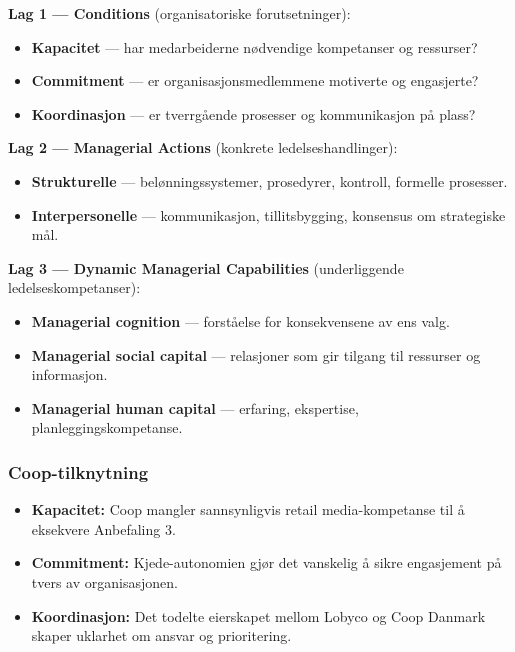 \textbf{Lag 1 --- Conditions} (organisatoriske forutsetninger):
\begin{itemize}
  \item \textbf{Kapacitet} --- har medarbeiderne nødvendige kompetanser
    og ressurser?
  \item \textbf{Commitment} --- er organisasjonsmedlemmene motiverte og
    engasjerte?
  \item \textbf{Koordinasjon} --- er tverrgående prosesser og
    kommunikasjon på plass?
\end{itemize}

\textbf{Lag 2 --- Managerial Actions} (konkrete ledelseshandlinger):
\begin{itemize}
  \item \textbf{Strukturelle} --- belønningssystemer, prosedyrer,
    kontroll, formelle prosesser.
  \item \textbf{Interpersonelle} --- kommunikasjon, tillitsbygging,
    konsensus om strategiske mål.
\end{itemize}

\textbf{Lag 3 --- Dynamic Managerial Capabilities} (underliggende
ledelseskompetanser):
\begin{itemize}
  \item \textbf{Managerial cognition} --- forståelse for konsekvensene
    av ens valg.
  \item \textbf{Managerial social capital} --- relasjoner som gir tilgang
    til ressurser og informasjon.
  \item \textbf{Managerial human capital} --- erfaring, ekspertise,
    planleggingskompetanse.
\end{itemize}

\subsubsection*{Coop-tilknytning}
\begin{itemize}
  \item \textbf{Kapacitet:} Coop mangler sannsynligvis retail
    media-kompetanse til å eksekvere Anbefaling 3.
  \item \textbf{Commitment:} Kjede-autonomien gjør det vanskelig å sikre
    engasjement på tvers av organisasjonen.
  \item \textbf{Koordinasjon:} Det todelte eierskapet mellom Lobyco og
    Coop Danmark skaper uklarhet om ansvar og prioritering.
\end{itemize}
